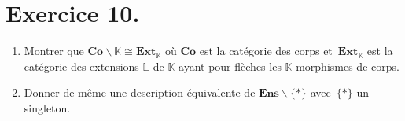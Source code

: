 \documentclass{../../td}
\begin{document}
  \chapter{Exercice 10.}

  \begin{slshape}
    \color{deepblue}
    \begin{enumerate}
      \item Montrer que $\mathbf{Co} \backslash \mathds{K} \cong \mathbf{Ext}_\mathds{K}$ où $\mathbf{Co}$ est la catégorie des corps et~$\mathbf{Ext}_\mathds{K}$ est la catégorie des extensions $\mathds{L}$ de $\mathds{K}$ ayant pour flèches les $\mathds{K}$-morphismes de corps.
      \item Donner de même une description équivalente de $\mathbf{Ens} \backslash \{*\}$ avec~$\{*\}$ un singleton.
    \end{enumerate}
  \end{slshape}
\end{document}
